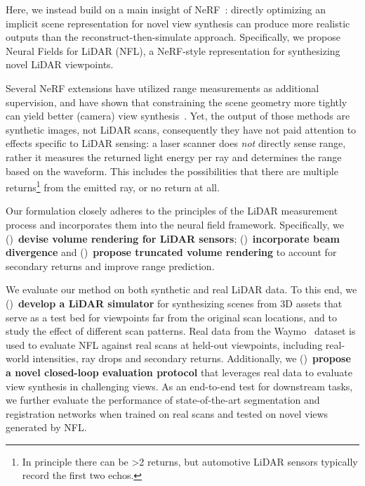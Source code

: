 Here, we instead build on a main insight of NeRF~\cite{mildenhall2020nerf}: directly optimizing an implicit scene representation for novel view synthesis can produce more realistic outputs than the reconstruct-then-simulate approach. Specifically, we propose Neural Fields for LiDAR (NFL), a NeRF-style representation for synthesizing novel LiDAR viewpoints.

Several NeRF extensions have utilized range measurements as additional supervision, and have shown that constraining the scene geometry more tightly can yield better (camera) view synthesis~\cite{deng2021depth,rematas2021urban}. Yet, the output of those methods are synthetic images, not LiDAR scans, consequently they have not paid attention to effects specific to LiDAR sensing: a laser scanner does \emph{not} directly sense range, rather it measures the returned light energy per ray and determines the range based on the waveform. 
This includes the possibilities that there are multiple returns\footnote{In principle there can be \textgreater2 returns, but automotive LiDAR sensors typically record the first two echos.} from the emitted ray, or no return at all.

Our formulation closely adheres to the principles of the LiDAR measurement process 
and incorporates them into the neural field framework. Specifically, we ()~\textbf{devise volume rendering for LiDAR sensors};  
()~\textbf{incorporate beam divergence} and ()~\textbf{propose truncated volume rendering} to account for secondary returns and improve range prediction. 

We evaluate our method on both synthetic and real LiDAR data. To this end, we ()~\textbf{develop a LiDAR simulator} for synthesizing scenes from 3D assets that serve as a test bed for viewpoints far from the original scan locations, and to study the effect of different scan patterns.
Real data from the Waymo~\cite{sun2020scalability} dataset is used to evaluate NFL against real scans at held-out viewpoints, including real-world intensities, ray drops and secondary returns. Additionally, we ()~\textbf{propose a novel closed-loop evaluation protocol} that leverages real data to evaluate view synthesis in challenging views.
As an end-to-end test for downstream tasks, we further evaluate the performance of state-of-the-art segmentation and registration networks when trained on real scans and tested on novel views generated by NFL.



